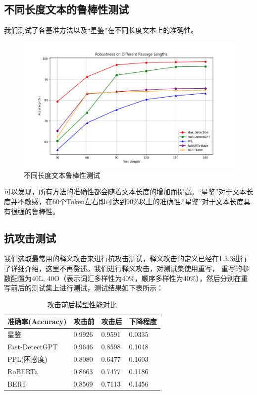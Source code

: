 \documentclass[a4paper]{report}
\begin{document}
\subsection{不同长度文本的鲁棒性测试}

我们测试了各基准方法以及“星鉴”在不同长度文本上的准确性。



\begin{figure}[H]
	\centering
	\includegraphics[width=\textwidth]{figures/Token.png}
	\caption{不同长度文本鲁棒性测试}
	\label{Token}
\end{figure}


可以发现，所有方法的准确性都会随着文本长度的增加而提高。“星鉴”对于文本长度并不敏感，在60个Token左右即可达到90\%以上的准确性.“星鉴”对于文本长度具有很强的鲁棒性。



\subsection{抗攻击测试}
我们选取最常用的释义攻击来进行抗攻击测试，释义攻击的定义已经在1.3.3进行了详细介绍，这里不再赘述。我们进行释义攻击，对测试集使用重写\cite{krishna2024paraphrasing}，%
重写的参数配置为40L, 40O（表示词汇多样性为40\%，顺序多样性为40\%），然后分别在重写前后的测试集上进行测试，测试结果如下表所示：
\begin{table}[H]
	\centering
	\caption{攻击前后模型性能对比}
	\begin{tabular}{p{}p{}p{}p{}}
		\toprule
		准确率(Accuracy)  & 攻击前    & 攻击后    & 下降程度   \\
		\midrule
		星鉴             & 0.9926 & 0.9591 & 0.0335 \\
		Fast-DetectGPT & 0.9646 & 0.8598 & 0.1048 \\
		PPL(困惑度)       & 0.8080 & 0.6477 & 0.1603 \\
		RoBERTa        & 0.8663 & 0.7477 & 0.1186 \\
		BERT           & 0.8569 & 0.7113 & 0.1456 \\
		\bottomrule
	\end{tabular}
\end{table}
\end{document}
